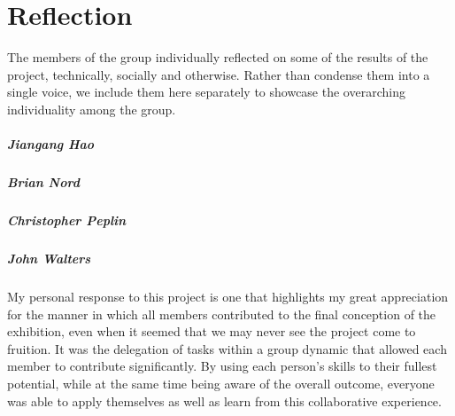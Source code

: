 \chapter{Reflection}
The members of the group individually reflected on some of the results of the project, technically, socially and otherwise.  Rather than condense them into a single voice, we include them here separately to showcase the overarching individuality among the group. 

\paragraph{Jiangang Hao}

\paragraph{Brian Nord}

\paragraph{Christopher Peplin}

\paragraph{John Walters}
My personal response to this project is one that highlights my great appreciation for the manner in which all members contributed to the final conception of the exhibition, even when it seemed that we may never see the project come to fruition. It was the delegation of tasks within a group dynamic that allowed each member to contribute significantly. By using each person’s skills to their fullest potential, while at the same time being aware of the overall outcome, everyone was able to apply themselves as well as learn from this collaborative experience.    

